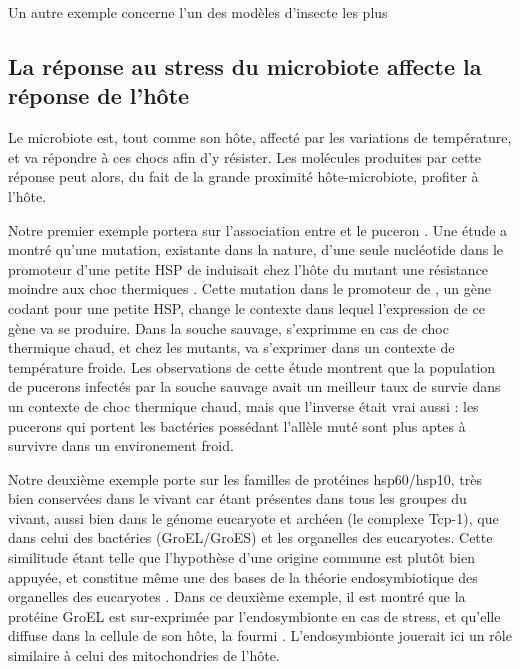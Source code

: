 Un autre exemple concerne l'un des modèles d'insecte les plus  


\subsection{La réponse au stress du microbiote affecte la réponse de l'hôte}

Le microbiote est, tout comme son hôte, affecté par les variations de température, et va répondre à ces chocs afin d'y résister.
Les molécules produites par cette réponse peut alors, du fait de la grande proximité hôte-microbiote, profiter à l'hôte.

Notre premier exemple portera sur l'association entre  et le puceron .
Une étude a montré qu'une mutation, existante dans la nature, d'une seule nucléotide dans le promoteur d'une petite HSP de  induisait chez l'hôte du mutant une résistance moindre aux choc thermiques \cite{dunbar2007}.
Cette mutation dans le promoteur de , un gène codant pour une petite HSP, change le contexte dans lequel l'expression de ce gène va se produire. Dans la souche sauvage,  s'exprimme en cas de choc thermique chaud, et chez les mutants,  va s'exprimer dans un contexte de température froide.
Les observations de cette étude montrent que la population de pucerons infectés par la souche sauvage avait un meilleur taux de survie dans un contexte de choc thermique chaud, mais que l'inverse était vrai aussi : les pucerons qui portent les bactéries possédant l'allèle muté sont plus aptes à survivre dans un environement froid.

Notre deuxième exemple porte sur les familles de protéines hsp60/hsp10, très bien conservées dans le vivant car étant présentes dans tous les groupes du vivant, aussi bien dans le génome eucaryote et archéen (le complexe Tcp-1), que dans celui des bactéries (GroEL/GroES) et les organelles des eucaryotes.
Cette similitude étant telle que l'hypothèse d'une origine commune est plutôt bien appuyée, et constitue même une des bases de la théorie endosymbiotique des organelles des eucaryotes \cite{gupta1995}.
Dans ce deuxième exemple, il est montré que la protéine GroEL est sur-exprimée par l'endosymbionte  en cas de stress, et qu'elle diffuse dans la cellule de son hôte, la fourmi  \cite{stoll2009}.
L'endosymbionte jouerait ici un rôle similaire à celui des mitochondries de l'hôte.


